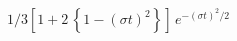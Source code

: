 \documentclass[12pt]{article}
\begin{document}
\begin{displaymath}
1/3 \left[ 1 + 2\, \left\{ 1 - (\sigma t)^2 \right\}\right]\, e^{-(\sigma t)^2/2}~
\end{displaymath}
\end{document}
